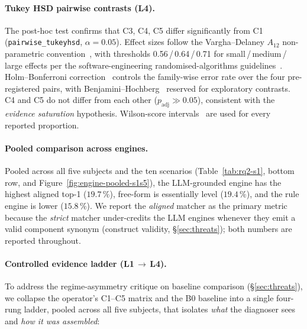 \documentclass[sigconf, nonacm=true, anonymous=false, review=false]{acmart}
\newcommand{\Cn}[1]{C#1\xspace}
\begin{document}
\paragraph{Tukey HSD pairwise contrasts (L4).} The
post-hoc test confirms that \Cn{3}, \Cn{4}, \Cn{5} differ
significantly from \Cn{1} (\texttt{pairwise\_tukeyhsd},
$\alpha = 0.05$). Effect sizes follow the Vargha--Delaney $A_{12}$
non-parametric convention~\cite{vargha_delaney_2000}, with thresholds
0.56\,/\,0.64\,/\,0.71 for small\,/\,medium\,/\,large effects per the
software-engineering randomised-algorithms
guidelines~\cite{arcuri_briand_2014}. Holm--Bonferroni
correction~\cite{holm_1979} controls the family-wise error rate over
the four pre-registered pairs, with
Benjamini--Hochberg~\cite{benjamini_hochberg_1995} reserved for
exploratory contrasts. \Cn{4} and \Cn{5} do not differ from each
other ($p_{\text{adj}} \gg 0.05$), consistent with the \emph{evidence
saturation} hypothesis. Wilson-score
intervals~\cite{wilson_score_ci} are used for every reported
proportion.

\paragraph{Pooled comparison across engines.}
Pooled across all five subjects and the ten scenarios
(Table~\ref{tab:rq2-s1}, bottom row, and
Figure~\ref{fig:engine-pooled-s1s5}), the LLM-grounded engine has the
highest aligned top-1 ($19.7\,\%$), free-form is essentially level
($19.4\,\%$), and the rule engine is lower ($15.8\,\%$). We report the
\emph{aligned} matcher as the primary metric because the \emph{strict}
matcher under-credits the LLM engines whenever they emit a valid
component synonym (construct validity, \S\ref{sec:threats}); both
numbers are reported throughout.

\paragraph{Controlled evidence ladder (L1\,$\to$\,L4).}
To address the regime-asymmetry critique on baseline comparison
(\S\ref{sec:threats}), we collapse the operator's \Cn{1}--\Cn{5} matrix
and the B0 baseline into a single four-rung ladder, pooled across all
five subjects, that isolates \emph{what} the diagnoser sees and
\emph{how it was assembled}:
\end{document}
